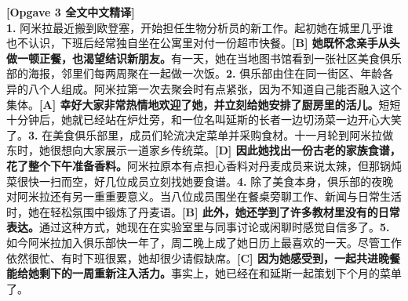 \begin{transbox}
\small
\textbf{\color{NCDTeal}[Opgave 3 全文中文精译]}\\
\textbf{1.} 阿米拉最近搬到欧登塞，开始担任生物分析员的新工作。起初她在城里几乎谁也不认识，下班后经常独自坐在公寓里对付一份超市快餐。\textbf{[B] 她既怀念亲手从头做一顿正餐，也渴望结识新朋友。}有一天，她在当地图书馆看到一张社区美食俱乐部的海报，邻里们每两周聚在一起做一次饭。\textbf{2.} 俱乐部由住在同一街区、年龄各异的八个人组成。阿米拉第一次去聚会时有点紧张，因为不知道自己能否融入这个集体。\textbf{[A] 幸好大家非常热情地欢迎了她，并立刻给她安排了厨房里的活儿。}短短十分钟后，她就已经站在炉灶旁，和一位名叫延斯的长者一边切汤菜一边开心大笑了。\textbf{3.} 在美食俱乐部里，成员们轮流决定菜单并采购食材。十一月轮到阿米拉做东时，她很想向大家展示一道家乡传统菜。\textbf{[D] 因此她找出一份古老的家族食谱，花了整个下午准备香料。}阿米拉原本有点担心香料对丹麦成员来说太辣，但那锅炖菜很快一扫而空，好几位成员立刻找她要食谱。\textbf{4.} 除了美食本身，俱乐部的夜晚对阿米拉还有另一重重要意义。当八位成员围坐在餐桌旁聊工作、新闻与日常生活时，她在轻松氛围中锻炼了丹麦语。\textbf{[B] 此外，她还学到了许多教材里没有的日常表达。}通过这种方式，她现在在实验室里与同事讨论或闲聊时感觉自信多了。\textbf{5.} 如今阿米拉加入俱乐部快一年了，周二晚上成了她日历上最喜欢的一天。尽管工作依然很忙、有时下班很累，她却很少请假缺席。\textbf{[C] 因为她感受到，一起共进晚餐能给她剩下的一周重新注入活力。}事实上，她已经在和延斯一起策划下个月的菜单了。
\end{transbox}

